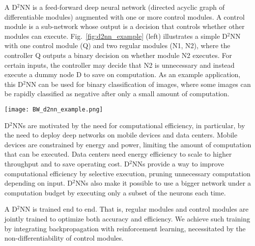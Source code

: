 \documentclass[10pt,twocolumn,letterpaper]{article}
\begin{document}
A D$^2$NN is a feed-forward deep neural network (directed acyclic graph of
differentiable modules) augmented with one or more control modules. A control module is a
sub-network whose output is a decision that controls whether other modules can
execute. Fig.~\ref{fig:d2nn_example} (left) illustrates a simple D$^2$NN with one control module (Q) and two
regular modules (N1, N2), where the controller Q outputs a binary decision on whether
module N2 executes. For certain inputs, the controller may decide that N2
is unnecessary and instead execute a dummy node D to save on computation.
As an example application, this D$^2$NN can be used for binary classification of
images, where some images can be rapidly classified as negative after only a small amount of
computation. 


\begin{figure*}[t] \centering 
\texttt{[image: BW\_d2nn\_example.png]}
\caption{Two D$^2$NN examples. Input and
output nodes are drawn as circles with the output nodes shaded. Function nodes are
drawn as rectangles (regular nodes) or
diamonds (control nodes). Dummy nodes are shaded.
Data edges are drawn as solid arrows and control edges as
dashed arrows. A data edge with a user defined default value is decorated with a circle.}
\label{fig:d2nn_example}
\end{figure*}


D$^2$NNs are motivated by the need for computational efficiency, in particular, by the
need to deploy deep networks on mobile devices and data centers. Mobile devices are
constrained by energy and power, limiting the amount of computation that can be executed. 
Data centers need energy efficiency to scale to higher
throughput and to save operating cost. D$^2$NNs provide a way to improve computational
efficiency by selective execution, pruning unnecessary computation depending on
input. D$^2$NNs also make it possible to use a bigger network under a
computation budget by executing only a subset of the neurons each time. 


A D$^2$NN is trained end to end. That is, regular modules and control modules are
jointly trained to optimize both accuracy and efficiency.  We achieve such training by
integrating backpropagation with reinforcement learning, necessitated by the
non-differentiability of control modules. 
\end{document}
